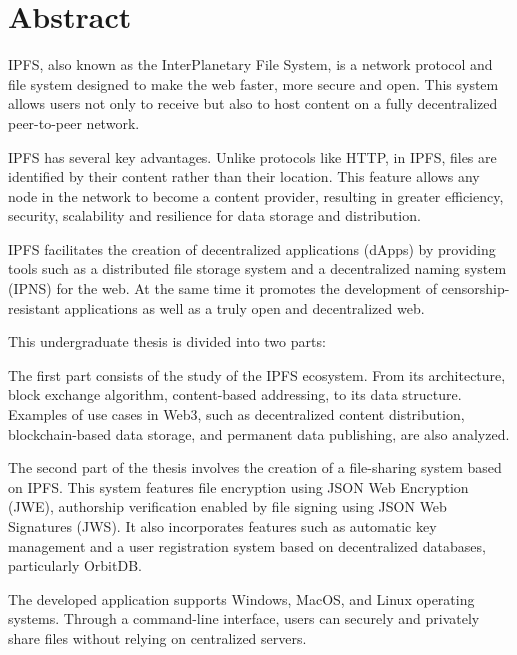 \chapter*{Abstract}



IPFS, also known as the InterPlanetary File System, is a network protocol and file system designed to make the web faster, more secure and open. This system allows users not only to receive but also to host content on a fully decentralized peer-to-peer network.

IPFS has several key advantages. Unlike protocols like HTTP, in IPFS, files are identified by their content rather than their location. This feature allows any node in the network to become a content provider, resulting in greater efficiency, security, scalability and resilience for data storage and distribution.

IPFS facilitates the creation of decentralized applications (dApps) by providing tools such as a distributed file storage system and a decentralized naming system (IPNS) for the web. At the same time it promotes the development of censorship-resistant applications as well as a truly open and decentralized web.

This undergraduate thesis is divided into two parts:

The first part consists of the study of the IPFS ecosystem. From its architecture, block exchange algorithm, content-based addressing, to its data structure. Examples of use cases in Web3, such as decentralized content distribution, blockchain-based data storage, and permanent data publishing, are also analyzed.

The second part of the thesis involves the creation of a file-sharing system based on IPFS. This system features file encryption using JSON Web Encryption (JWE), authorship verification enabled by file signing using JSON Web Signatures (JWS). It also incorporates features such as automatic key management and a user registration system based on decentralized databases, particularly OrbitDB.

The developed application supports Windows, MacOS, and Linux operating systems. Through a command-line interface, users can securely and privately share files without relying on centralized servers.